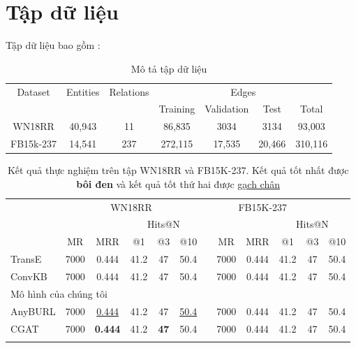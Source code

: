 
\section{Tập dữ liệu}

Tập dữ liệu bao gồm :


\begin{table}[htbp]
\begin{center}
\label{tab:datasetdesc}%
\begin{tabular}{ |c|c c|c c c c| }
	\hline
	\multirow{2}{*}{Dataset} & \multirow{2}{*}{ Entities} & \multirow{2}{*}{ Relations} & \multicolumn{4}{c|}{ Edges} \\
	\cline{4-7}
	&  &  & Training & Validation & Test& Total \\
	\hline
	WN18RR & 40,943 & 11 & 86,835 & 3034 & 3134 & 93,003 \\
	\hline
	FB15k-237 & 14,541 & 237 &  272,115 & 17,535 & 20,466 & 310,116 \\
	\hline
\end{tabular}

\caption{Mô tả tập dữ liệu}
\end{center}
\end{table}


\begin{table}[htbp]
	\begin{center}
\label{tab:experiment}%
\begin{tabular}{ m{3cm} c c c c c p{0.05cm} c c c c c}
	\firsthline
	& \multicolumn{5}{c}{WN18RR} & \multicolumn{5}{c}{FB15K-237} \\
	\cline{2-6}
	\cline{8-12}
	& & & \multicolumn{3}{c}{Hits@N} & & & & \multicolumn{3}{c}{Hits@N}\\
	\cline{4-6}
	\cline{10-12}
	& MR & MRR & @1 & @3 & @10 & & MR & MRR & @1 & @3 & @10\\
	\hline
	TransE & 7000 & 0.444 & 41.2 & 47 & 50.4 & & 7000 & 0.444 & 41.2 & 47 & 50.4 \\
	ConvKB & 7000 & 0.444 & 41.2 & 47 & 50.4 & & 7000 & 0.444 & 41.2 & 47 & 50.4 \\
	\hline
	\multicolumn{6}{l}{Mô hình của chúng tôi}\\
	AnyBURL & 7000 & \underline{0.444} & 41.2 & 47 & \underline{50.4} & & 7000 & 0.444 & 41.2 & 47 & 50.4 \\
	CGAT    & 7000 & \textbf{0.444} & 41.2 & \textbf{47} & 50.4 & & 7000 & 0.444 & 41.2 & 47 & 50.4 \\
	\lasthline
\end{tabular}
\caption{Kết quả thực nghiệm trên tập WN18RR và FB15K-237. Kết quả tốt nhất được \textbf{bôi đen} và kết quả tốt thứ hai được \underline{gạch chân}}
\end{center}
\end{table}

